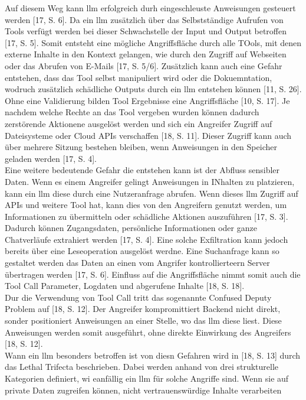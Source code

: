 Auf diesem Weg kann \ac{llm} erfolgreich durh eingeschleuste Anweisungen gesteuert werden [17, S. 6]. Da ein \ac{llm} zusätzlich über das Selbstständige 
Aufrufen von Tools verfügt werden bei dieser Schwachstelle der Input und Output betroffen [17, S. 5]. Somit entsteht eine mögliche Angriffsfläche durch alle TOols, 
mit denen externe Inhalte in den Kontext gelangen, wie durch den Zugriff auf Webseiten oder das Abrufen von E-Mails [17, S. 5/6]. Zusätzlich kann auch eine Gefahr
entstehen, dass das Tool selbst manipuliert wird oder die Dokuemntation, wodruch zusätzlich schädliche Outputs durch ein \ac{llm} entstehen können [11, S. 26].
Ohne eine Validierung bilden Tool Ergebnisse eine Angriffsfläche [10, S. 17]. Je nachdem welche Rechte an das Tool vergeben wurden können dadurch 
zerstörende Aktionene ausgelöst werden und sich ein Angreifer Zugriff auf Dateisysteme oder Cloud APIs verschaffen [18, S. 11]. Dieser Zugriff kann auch 
über mehrere Sitzung bestehen bleiben, wenn Anweisungen in den Speicher geladen werden [17, S. 4]. \\
Eine weitere bedeutende Gefahr die entstehen kann ist der Abfluss sensibler Daten. Wenn es einem Angreifer gelingt Anweisungen in INhalten zu platzieren, kann ein
\ac{llm} diese durch eine Nutzeranfrage abrufen. Wenn dieses \ac{llm} Zugriff auf APIs und weitere Tool hat, kann dies von den Angreifern genutzt werden, um 
Informationen zu übermitteln oder schädliche Aktionen auszuführen [17, S. 3]. Dadurch können Zugangsdaten, persönliche Informationen oder ganze Chatverläufe 
extrahiert werden [17, S. 4]. Eine solche Exfiltration kann jedoch bereits über eine Leseoperation ausgelöst werdne. Eine Suchanfrage kann so gestaltet werden das Daten
an einen vom Angrifer kontrollierteern Server übertragen werden [17, S. 6]. Einfluss auf die Angriffsfläche nimmt somit auch die Tool Call Parameter, Logdaten und
abgerufene Inhalte [18, S. 18]. \\
Dur die Verwendung von Tool Call tritt das sogenannte Confused Deputy Problem auf [18, S. 12]. Der Angreifer kompromittiert Backend nicht direkt, sonder positioniert
Anweisungen an einer Stelle, wo das \ac{llm} diese liest. Diese Anweisungen werden somit ausgeführt, ohne direkte Einwirkung des Angreifers [18, S. 12]. \\
Wann ein \ac{llm} besonders betroffen ist von diesn Gefahren wird in [18, S. 13] durch das Lethal Trifecta beschrieben. Dabei werden anhand von drei strukturelle
Kategorien definiert, wi eanfällig ein \ac{llm} für solche Angriffe sind. Wenn sie auf private Daten zugreifen können, nicht vertrauenswürdige Inhalte verarbeiten
